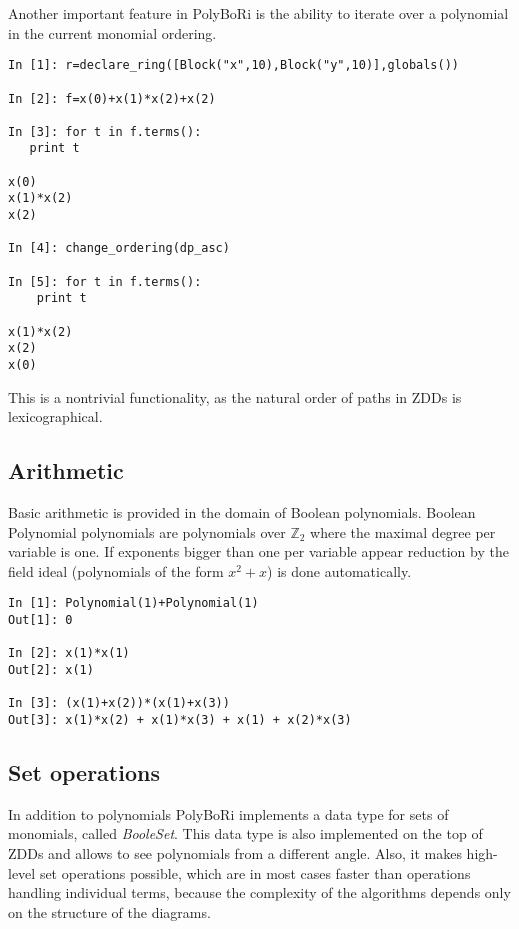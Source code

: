 \documentclass[]{article}
\newcommand{\PolyBoRi}{{\sc PolyBoRi}\xspace}
\newcommand{\functionname}[1]{\textit{#1}\xspace}
\newcommand{\Ztwo}{\mathbb{Z}_2}
\newcounter{thm}
\begin{document}
Another important feature in \PolyBoRi is the ability to iterate over a polynomial in the current monomial ordering.

\begin{verbatim}
In [1]: r=declare_ring([Block("x",10),Block("y",10)],globals())

In [2]: f=x(0)+x(1)*x(2)+x(2)

In [3]: for t in f.terms():
   print t
   
x(0)
x(1)*x(2)
x(2)

In [4]: change_ordering(dp_asc)

In [5]: for t in f.terms():
    print t

x(1)*x(2)
x(2)
x(0)
\end{verbatim}
%
This is a nontrivial functionality, as the natural order of paths in ZDDs is lexicographical.


\subsection{Arithmetic}
Basic arithmetic is provided in the domain of Boolean polynomials. Boolean Polynomial polynomials are polynomials over $\Ztwo$ where the maximal degree per variable is one.
If exponents bigger than one per variable appear reduction by the field ideal (polynomials of the form $x^2+x$) is done automatically.
\begin{verbatim}
In [1]: Polynomial(1)+Polynomial(1)
Out[1]: 0

In [2]: x(1)*x(1)
Out[2]: x(1)

In [3]: (x(1)+x(2))*(x(1)+x(3))
Out[3]: x(1)*x(2) + x(1)*x(3) + x(1) + x(2)*x(3)
\end{verbatim}

\subsection{Set operations}
In addition to polynomials  \PolyBoRi implements a data type for sets of monomials, called \functionname{BooleSet}.
This data type is also implemented on the top of ZDDs and allows to see
polynomials
from a different angle. Also, it makes high-level set operations possible, which are in most cases faster than operations handling individual terms, because the complexity of the algorithms depends only on the structure of the diagrams.
\end{document}
